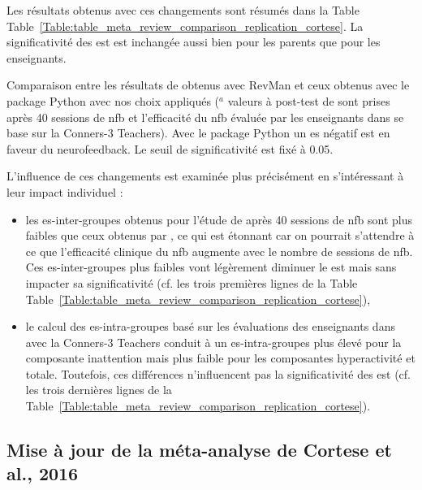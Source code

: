 Les résultats obtenus avec ces changements sont résumés dans la Table Table~\ref{Table:table_meta_review_comparison_replication_cortese}.
La significativité des \gls{est} est inchangée aussi bien pour les parents que pour les enseignants.

\begin{table}[h!]
  \centering
  \caption{Comparaison entre les résultats de \citet{Cortese2016} obtenus avec RevMan \citep{Revman} et ceux obtenus avec le package Python \citep{Bussalb2019a}
	avec nos choix appliqués ($^a$ valeurs à post-test de \citet{Arnold2014} sont prises après 40 sessions de \gls{nfb} et l'efficacité du \gls{nfb} évaluée 
	par les enseignants dans \citet{Steiner2014} se base sur la Conners-3 Teachers).
	Avec le package Python un \gls{es} négatif est en faveur du neurofeedback. Le seuil de significativité est fixé à 0.05.}
  
  \label{Table:table_meta_review_comparison_replication_cortese}
\end{table}

L'influence de ces changements est examinée plus précisément en s'intéressant à leur impact individuel :
\begin{itemize}
\item les \gls{es}-inter-groupes obtenus pour l'étude de \citet{Arnold2014} après 40 sessions de \gls{nfb} sont plus faibles que ceux obtenus 
par \citet{Cortese2016}, ce qui est étonnant car on pourrait s'attendre à ce que l'efficacité clinique du \gls{nfb} augmente avec le nombre de
sessions de \gls{nfb}. Ces \gls{es}-inter-groupes plus faibles vont légèrement diminuer le \gls{est} mais sans impacter sa significativité 
(cf. les trois premières lignes de la Table Table~\ref{Table:table_meta_review_comparison_replication_cortese}),
\item le calcul des \gls{es}-intra-groupes basé sur les évaluations des enseignants dans \citet{Steiner2014} avec la Conners-3 Teachers
conduit à un \gls{es}-intra-groupes plus élevé pour la composante inattention mais plus faible pour les composantes hyperactivité et totale. Toutefois, ces
différences n'influencent pas la significativité des \gls{est} (cf. les trois dernières lignes de la 
Table~\ref{Table:table_meta_review_comparison_replication_cortese}). 
\end{itemize}

\subsection{Mise à jour de la méta-analyse de Cortese et al., 2016} \label{selection_studies}

